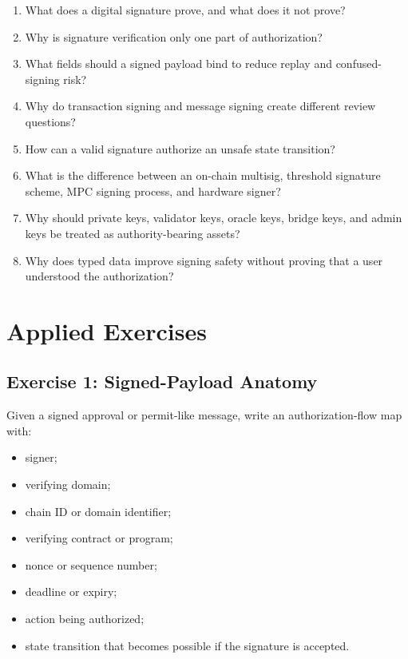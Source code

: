 \begin{enumerate}
\def\labelenumi{\arabic{enumi}.}
\tightlist
\item
  What does a digital signature prove, and what does it not prove?
\item
  Why is signature verification only one part of authorization?
\item
  What fields should a signed payload bind to reduce replay and confused-signing risk?
\item
  Why do transaction signing and message signing create different review questions?
\item
  How can a valid signature authorize an unsafe state transition?
\item
  What is the difference between an on-chain multisig, threshold signature scheme, MPC signing process, and hardware signer?
\item
  Why should private keys, validator keys, oracle keys, bridge keys, and admin keys be treated as authority-bearing assets?
\item
  Why does typed data improve signing safety without proving that a user understood the authorization?
\end{enumerate}

\section{Applied Exercises}

\subsection{Exercise 1: Signed-Payload Anatomy}

Given a signed approval or permit-like message, write an authorization-flow map with:

\begin{itemize}
\tightlist
\item
  signer;
\item
  verifying domain;
\item
  chain ID or domain identifier;
\item
  verifying contract or program;
\item
  nonce or sequence number;
\item
  deadline or expiry;
\item
  action being authorized;
\item
  state transition that becomes possible if the signature is accepted.
\end{itemize}

